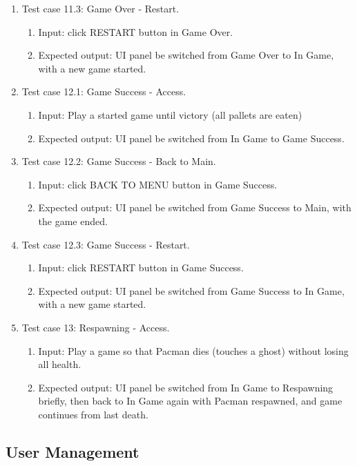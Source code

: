 \documentclass[11pt]{article}
\begin{document}
\begin{enumerate}
        \item Test case 11.3: Game Over - Restart.
        \begin{enumerate}
            \item  Input: click RESTART button in Game Over.
            \item  Expected output: UI panel be switched from Game Over to In Game, with a new game started.
        \end{enumerate}
        \item Test case 12.1: Game Success - Access.
        \begin{enumerate}
            \item  Input: Play a started game until victory (all pallets are eaten)
            \item  Expected output: UI panel be switched from In Game to Game Success.
        \end{enumerate}
        \item Test case 12.2: Game Success - Back to Main.
        \begin{enumerate}
            \item  Input: click BACK TO MENU button in Game Success.
            \item  Expected output: UI panel be switched from Game Success to Main, with the game ended.
        \end{enumerate}
        \item Test case 12.3: Game Success - Restart.
        \begin{enumerate}
            \item  Input: click RESTART button in Game Success.
            \item  Expected output: UI panel be switched from Game Success to In Game, with a new game started.
        \end{enumerate}
        \item Test case 13: Respawning - Access.
        \begin{enumerate}
            \item  Input: Play a game so that Pacman dies (touches a ghost) without losing all health.
            \item  Expected output: UI panel be switched from In Game to Respawning briefly, then back to In Game again with Pacman respawned, and game continues from last death.
        \end{enumerate}
    \end{enumerate}
    

    \subsection{User Management}
\end{document}
